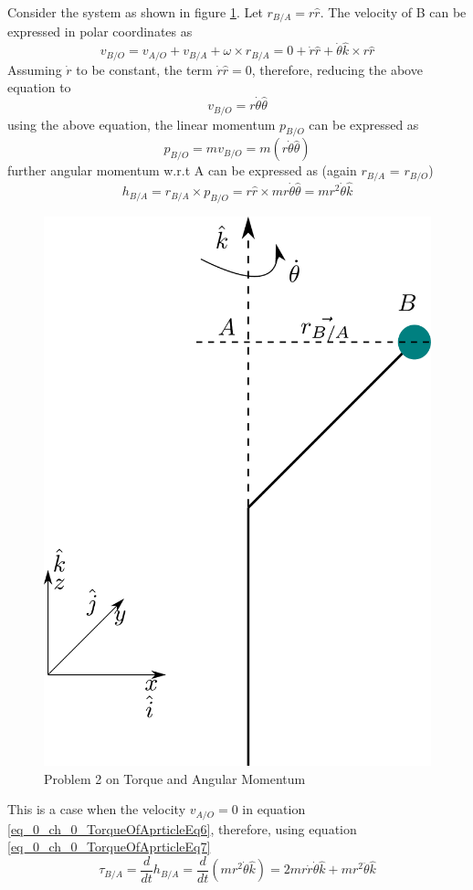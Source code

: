 Consider the system as shown in figure \ref{fig_0_ch_2_Problem2}. Let $r_{B/A} = r \hat{r}$. The velocity of B can be expressed in polar coordinates as
\begin{equation}
	v_{B/O} = v_{A/O} + v_{B/A} + \omega \times r_{B/A} = 0 + \dot{r} \hat{r} + \dot{\theta} \hat{k} \times r \hat{r}
\end{equation}
Assuming $\dot{r}$ to be constant, the term $\dot{r} \hat{r} = 0$, therefore, reducing the above equation to
\begin{equation}
	v_{B/O} = r \dot{\theta} \hat{\theta}
\end{equation}
using the above equation, the linear momentum $p_{B/O}$ can be expressed as
\begin{equation}
	p_{B/O} = m v_{B/O} = m \left( r \dot{\theta} \hat{\theta} \right)
\end{equation}
further angular momentum w.r.t A can be expressed as (again $r_{B/A}$ = $r_{B/O}$)
\begin{equation}
	h_{B/A} = r_{B/A} \times p_{B/O} = r \hat{r} \times m r \dot{\theta} \hat{\theta} = m r^{2} \dot{\theta} \hat{k}
\end{equation}
\newpage 
\begin{figure}[h!]
	\centering
	\includegraphics[width=0.5\linewidth]{Bilder/051_vel_acc_polar_coordinates.pdf}
	\caption{Problem 2 on Torque and Angular Momentum}
	\label{fig_0_ch_2_Problem2}
\end{figure}
This is a case when the velocity $v_{A/O} = 0$ in equation \eqref{eq_0_ch_0_TorqueOfAprticleEq6}, therefore, using equation \eqref{eq_0_ch_0_TorqueOfAprticleEq7}
\begin{equation}
	\tau_{B/A} = \frac{d}{dt} h_{B/A} = \frac{d}{dt} \left( m r^{2} \dot{\theta} \hat{k} \right) = 2 m r \dot{r} \dot{\theta} \hat{k} + m r^{2}\ddot{\theta} \hat{k}
\end{equation}
